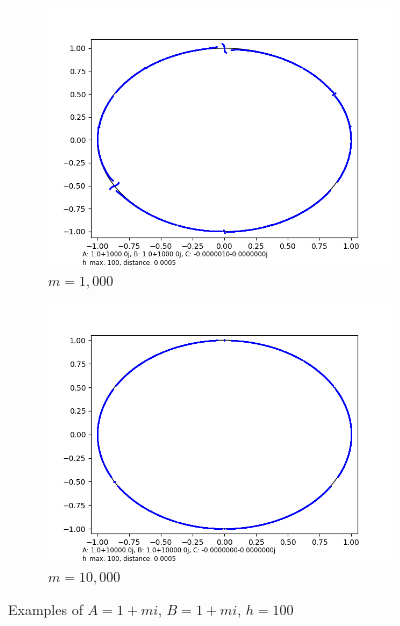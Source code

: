 \documentclass[12pt,a4paper,reqno,parskip=full]{amsart}
\numberwithin{equation}{section}
\theoremstyle{plain}
\theoremstyle{definition}
\begin{document}
\begin{figure}[H]
\begin{subfigure}[b]{0.3\textwidth}
         \centering
         \includegraphics[width=\textwidth]{images/m/a1000,b1000,h100,d.0005.png}
         \caption{$m=1,000$}
         \label{fig:m1,000}
     \end{subfigure}
     \hfill
     \begin{subfigure}[b]{0.3\textwidth}
         \centering
         \includegraphics[width=\textwidth]{images/m/a10,000,b10,000,h100,d.0005.png}
         \caption{$m=10,000$}
         \label{fig:m10,000}
     \end{subfigure}
     
        \caption{Examples of $A=1+mi$, $B=1+mi$, $h=100$}
        \label{fig:m}
\end{figure}
\end{document}
